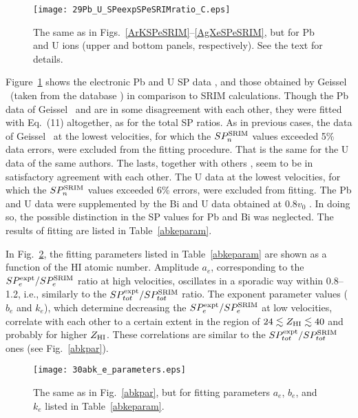\documentclass[aps,pra,twocolumn,amsmath,amssymb,floatfix]{revtex4-2}
\begin{document}
\begin{figure}[!h]  %
\begin{center}
\texttt{[image: 29Pb\_U\_SPeexpSPeSRIMratio\_C.eps]}
\caption{\label{PbUSPeSRIM}The same as in Figs.~\ref{ArKSPeSRIM}--\ref{AgXeSPeSRIM}, but for Pb and U ions (upper and bottom panels, respectively). See the text for details.}
\end{center}
\end{figure}

Figure~\ref{PbUSPeSRIM} shows the electronic Pb and U SP data \cite{Lennard86,BrownMoak72,Pape78,Echler12}, and those obtained by Geissel \ea\ (taken from the database \cite{IAEASP}) in comparison to SRIM calculations. Though the Pb data of Geissel \ea\ and \cite{Pape78} are in some disagreement with each other, they were fitted with Eq.~(11) altogether, as for the total SP ratios. As in previous cases, the data of Geissel \ea\ at the lowest velocities, for which the $SP_{n}^{\rm SRIM}$ values exceeded 5\% data errors, were excluded from the fitting procedure. That is the same for the U data of the same authors. The lasts, together with others \cite{BrownMoak72,Echler12}, seem to be in satisfactory agreement with each other.  The U data \cite{Echler12} at the lowest velocities, for which the $SP_{n}^{\rm SRIM}$ values exceeded 6\% errors, were excluded from fitting. The Pb and U data were supplemented by the Bi and U data obtained at $0.8 v_{0}$ \cite{Lennard86}. In doing so, the possible distinction in the SP values for Pb and Bi was neglected. The results of fitting are listed in Table~\ref{abkeparam}.

In Fig.~\ref{abkepar}, the fitting parameters listed in Table~\ref{abkeparam} are shown as a function of the HI atomic number. Amplitude $a_{e}$, corresponding to the $SP_{e}^{\rm expt}/SP_{e}^{\rm SRIM}$ ratio at high velocities, oscillates in a sporadic way within 0.8--1.2, i.e., similarly to the $SP_{tot}^{\rm expt}/SP_{tot}^{\rm SRIM}$ ratio. The exponent parameter values ($b_{e}$ and $k_{e}$), which determine decreasing the $SP_{e}^{\rm expt} / SP_{e}^{\rm SRIM}$ at low velocities, correlate with each other to a certain extent in the region of $24 \lesssim Z_{\rm HI} \lesssim 40$ and probably for higher $Z_{\rm HI}$. These correlations are similar to the $SP_{tot}^{\rm expt}/SP_{tot}^{\rm SRIM}$ ones (see Fig.~\ref{abkpar}).
\begin{figure}[!h]  %
\begin{center}
\texttt{[image: 30abk\_e\_parameters.eps]}
\caption{\label{abkepar}The same as in Fig.~\ref{abkpar}, but for fitting parameters $a_{e}$, $b_{e}$, and $k_{e}$ listed in Table~\ref{abkeparam}.}
\end{center}
\end{figure}
\end{document}
